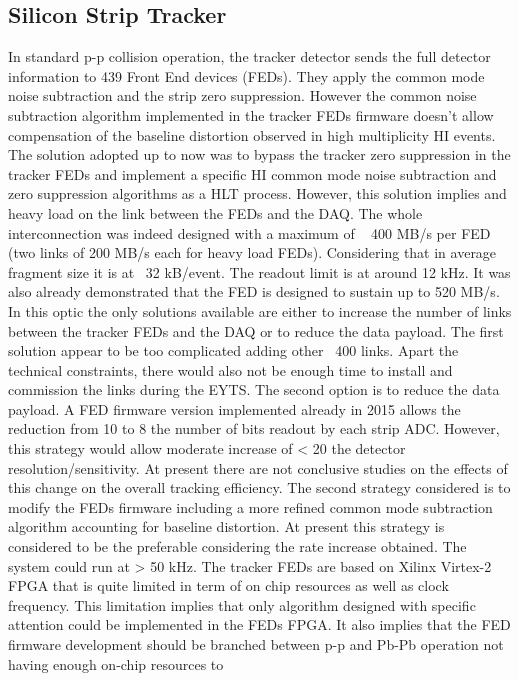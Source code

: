 \subsection{Silicon Strip Tracker\label{subsec:SiTracker}}
In standard p-p collision operation, the tracker detector sends the full detector information to 439 Front End devices
(FEDs). They apply the common mode noise subtraction and the strip zero suppression. However the common noise
subtraction algorithm implemented in the tracker FEDs firmware doesn’t allow compensation of the baseline distortion
observed in high multiplicity HI events. The solution adopted up to now was to bypass the tracker zero suppression in
the tracker FEDs and implement a specific HI common mode noise subtraction and zero suppression algorithms as a HLT
process. However, this solution implies and heavy load on the link between the FEDs and the DAQ.  The whole
interconnection was indeed designed with a maximum of ~ 400 MB/s per FED (two links of 200 MB/s each for heavy load
FEDs).  Considering that in average fragment size it is at ~32 kB/event. The readout limit is at around 12 kHz. It was
also already demonstrated that the FED is designed to sustain up to 520 MB/s. In this optic the only solutions available
are either to increase the number of links between the tracker FEDs and the DAQ or to reduce the data payload. The first
solution appear to be too complicated adding other ~400 links. Apart the technical constraints, there would also not be
enough time to install and commission the links during the EYTS. The second option is to reduce the data payload. A FED
firmware version implemented already in 2015 allows the reduction from 10 to 8 the number of bits readout by each strip
ADC. However, this strategy would allow moderate increase of < 20 %
the detector resolution/sensitivity. At present there are not conclusive studies on the effects of this change on the
overall tracking efficiency. The second strategy considered is to modify the FEDs firmware including a more refined
common mode subtraction algorithm accounting for baseline distortion.  At present this strategy is considered to be the
preferable considering the rate increase obtained. The system could run at > 50 kHz. The tracker FEDs are based on
Xilinx Virtex-2 FPGA that is quite limited in term of on chip resources as well as clock frequency. This limitation
implies that only algorithm designed with specific attention could be implemented in the FEDs FPGA. It also implies that
the FED firmware development should be branched between p-p and Pb-Pb operation not having enough on-chip resources to
